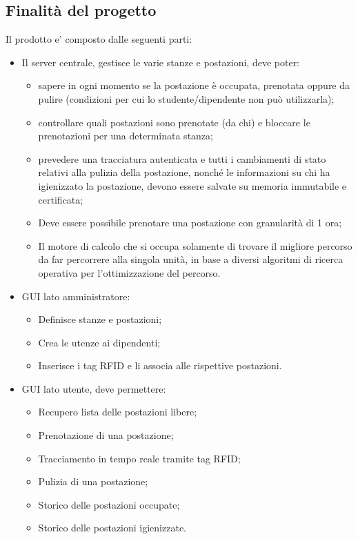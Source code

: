 \subsection{Finalità del progetto}
Il prodotto e' composto dalle seguenti parti:
\begin{itemize}
\item Il server centrale, gestisce le varie stanze e postazioni, deve poter:
\begin{itemize}
\item sapere in ogni momento se la postazione è occupata, prenotata oppure da pulire (condizioni per cui
lo studente/dipendente non può utilizzarla);
\item controllare quali postazioni sono prenotate (da chi) e bloccare le prenotazioni per una determinata stanza;
\item prevedere una tracciatura autenticata e tutti i cambiamenti di stato relativi alla pulizia della
postazione, nonché le informazioni su chi ha igienizzato la postazione, devono essere salvate su
memoria immutabile e certificata;
\item Deve essere possibile prenotare una postazione con granularità di 1 ora;
\item Il motore di calcolo che si occupa solamente di trovare il migliore percorso da far percorrere alla singola unità, in base a diversi algoritmi di ricerca operativa per l'ottimizzazione del percorso.
\end{itemize}
\item GUI lato amministratore:
\begin{itemize}
\item Definisce stanze e postazioni;
\item Crea le utenze ai dipendenti;
\item Inserisce i tag RFID e li associa alle rispettive postazioni.
\end{itemize}
\item GUI lato utente, deve permettere:
\begin{itemize}
\item Recupero lista delle postazioni libere;
\item Prenotazione di una postazione;
\item Tracciamento in tempo reale tramite tag RFID;
\item Pulizia di una postazione;
\item Storico delle postazioni occupate;
\item Storico delle postazioni igienizzate.
\end{itemize}
\end{itemize}

